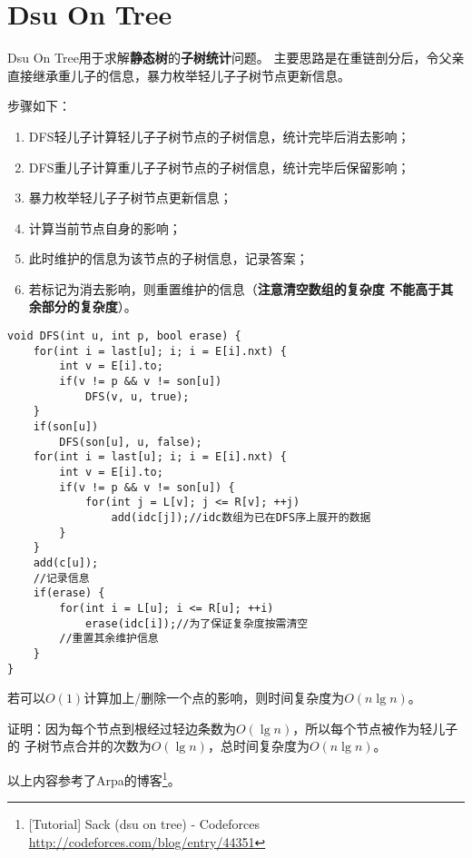 \section{Dsu On Tree}\label{DOT}
Dsu On Tree用于求解{\bfseries 静态树}的{\bfseries 子树统计}问题。
主要思路是在重链剖分后，令父亲直接继承重儿子的信息，暴力枚举轻儿子子树节点更新信息。

步骤如下：
\begin{enumerate}
    \item DFS轻儿子计算轻儿子子树节点的子树信息，统计完毕后消去影响；
    \item DFS重儿子计算重儿子子树节点的子树信息，统计完毕后保留影响；
    \item 暴力枚举轻儿子子树节点更新信息；
    \item 计算当前节点自身的影响；
    \item 此时维护的信息为该节点的子树信息，记录答案；
    \item 若标记为消去影响，则重置维护的信息（{\bfseries 注意清空数组的复杂度
    不能高于其余部分的复杂度}）。
\end{enumerate}

\begin{lstlisting}[title=Dsu On Tree]
void DFS(int u, int p, bool erase) {
    for(int i = last[u]; i; i = E[i].nxt) {
        int v = E[i].to;
        if(v != p && v != son[u])
            DFS(v, u, true);
    }
    if(son[u])
        DFS(son[u], u, false);
    for(int i = last[u]; i; i = E[i].nxt) {
        int v = E[i].to;
        if(v != p && v != son[u]) {
            for(int j = L[v]; j <= R[v]; ++j)
                add(idc[j]);//idc数组为已在DFS序上展开的数据
        }
    }
    add(c[u]);
    //记录信息
    if(erase) {
        for(int i = L[u]; i <= R[u]; ++i)
            erase(idc[i]);//为了保证复杂度按需清空
        //重置其余维护信息
    }
}
\end{lstlisting}

若可以$O(1)$计算加上/删除一个点的影响，则时间复杂度为$O(n\lg n)$。

证明：因为每个节点到根经过轻边条数为$O(\lg n)$，所以每个节点被作为轻儿子的
子树节点合并的次数为$O(\lg n)$，总时间复杂度为$O(n\lg n)$。

以上内容参考了Arpa的博客\footnote{[Tutorial] Sack (dsu on tree) - Codeforces
    \url{http://codeforces.com/blog/entry/44351}
}。

